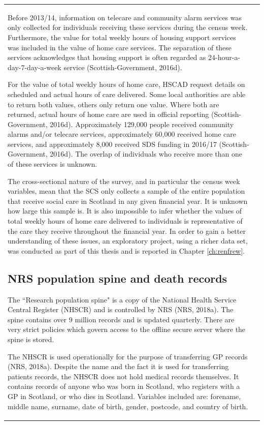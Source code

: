 \documentclass[12pt,a4paper,oneside,table]{report}
\begin{document}
\begin{tabular}[t]{ll}
Before 2013/14, information on telecare and community alarm services was
only collected for individuals receiving these services during the
census week. Furthermore, the value for total weekly hours of housing
support services was included in the value of home care services. The
separation of these services acknowledges that housing support is often
regarded as 24-hour-a-day-7-day-a-week service (Scottish-Government,
2016d).

For the value of total weekly hours of home care, HSCAD request details
on scheduled and actual hours of care delivered. Some local authorities
are able to return both values, others only return one value. Where both
are returned, actual hours of home care are used in official reporting
(Scottish-Government, 2016d). Approximately 129,000 people received
community alarms and/or telecare services, approximately 60,000 received
home care services, and approximately 8,000 received SDS funding in
2016/17 (Scottish-Government, 2016d). The overlap of individuals who
receive more than one of these services is unknown.

The cross-sectional nature of the survey, and in particular the census
week variables, mean that the SCS only collects a sample of the entire
population that receive social care in Scotland in any given financial
year. It is unknown how large this sample is. It is also impossible to
infer whether the values of total weekly hours of home care delivered to
individuals is representative of the care they receive throughout the
financial year. In order to gain a better understanding of these issues,
an exploratory project, using a richer data set, was conducted as part
of this thesis and is reported in Chapter \ref{ch:renfrew}.

\subsection{NRS population spine and death records}\label{subsec:source-nhscr}

The ``Research population spine" is a copy of the National Health
Service Central Register (NHSCR) and is controlled by NRS (NRS, 2018a).
The spine contains over 9 million records and is updated quarterly.
There are very strict policies which govern access to the offline secure
server where the spine is stored.

The NHSCR is used operationally for the purpose of transferring GP
records (NRS, 2018a). Despite the name and the fact it is used for
transferring patients records, the NHSCR does not hold medical records
themselves. It contains records of anyone who was born in Scotland, who
registers with a GP in Scotland, or who dies in Scotland. Variables
included are: forename, middle name, surname, date of birth, gender,
postcode, and country of birth.


\end{tabular}
\end{document}

